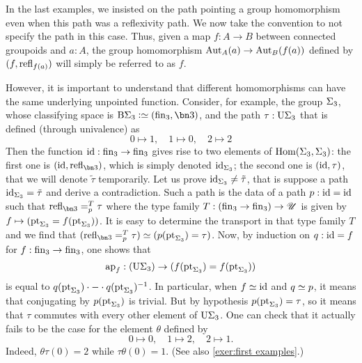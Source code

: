 \begin{remark}
  In the last examples, we insisted on the path pointing a group
  homomorphism even when this path was a reflexivity path. We now take
  the convention to not specify the path in this case. Thus, given a
  map $f:A \to B$ between connected groupoids and $a:A$, the group
  homomorphism $\Aut_A(a) \to \Aut_B(f(a))$ defined by
  $(f,\refl{f(a)})$ will simply be referred to as $f$.

  However, it is important to understand that different homomorphisms
  can have the same underlying unpointed function. Consider, for
  example, the group $\Sigma_{{3}}$, whose classifying space is
  $\clf \permgrp 3\defequi (\fin_3,\bn 3)$, and the path
  $\tau:\mathrm{U}{\Sigma_{{3}}}$ that is defined (through
  univalence) as
  \begin{displaymath}
    0\mapsto 1,\quad 1\mapsto 0,\quad 2 \mapsto 2 
  \end{displaymath}
  Then the function $\id: \fin_3 \to \fin_3$ gives rise to two
  elements of $\Hom(\permgrp 3,\permgrp 3)$: the first one is
  $(\id,\refl{\bn 3})$, which is simply denoted $\mathord{\mathrm{id}}_{\Sigma_{{3}}}$;
  the second one is $(\mathord{\mathrm{id}},\tau)$, that we will denote $\tilde\tau$
  temporarily. Let us prove $\mathord{\mathrm{id}}_{\Sigma_{{3}}} \neq \tilde \tau$, that
  is suppose a path $\mathord{\mathrm{id}}_{\Sigma_{{3}}}= \tilde \tau$ and derive a
  contradiction. Such a path is the data of a path $p:\mathord{\mathrm{id}} = \mathord{\mathrm{id}}$ such
  that $\pathover {\refl{\bn 3}} {T} {p} \tau$ where the type family
  $T:(\fin_3\to\fin_3) \to \UU$ is given by
  $f\mapsto (\mathrm{pt}_{\Sigma_{{3}}} = f(\mathrm{pt}_{\Sigma_{{3}}}))$. It is easy to
  determine the transport in that type family $T$ and we find that
  $(\pathover {\refl{\bn 3}} {T} {p} \tau) \weq (p(\pt_{\permgrp
    3})=\tau)$. Now, by induction on $q:\mathord{\mathrm{id}}=f$ for
  $f:\fin_3 \to \fin_3$, one shows that
  \begin{displaymath}
    \ap f : (\USym{\permgrp 3}) \to
    (f(\pt_{\permgrp 3}) = f(\pt_{\permgrp 3}))
  \end{displaymath}
  is equal to
  $q(\mathrm{pt}_{\Sigma_{{3}}})\cdot {{-}}\cdot q(\mathrm{pt}_{\Sigma_{{3}}})^{-1}$. In particular, when $f\jdeq \id$ and $q\jdeq p$, it means
  that conjugating by $p(\mathrm{pt}_{\Sigma_{{3}}})$ is trivial. But by
  hypothesis $p(\mathrm{pt}_{\Sigma_{{3}}}) = \tau$, so it means that $\tau$
  commutes with every other element of
  $\mathrm{U}{\Sigma_{{3}}}$. One can check that it
  actually fails to be the case for the element $\theta$ defined by
  \begin{displaymath}
    0\mapsto 0,\quad 1\mapsto 2,\quad 2\mapsto 1 .
  \end{displaymath}
  Indeed, $\theta\tau(0) = 2$ while $\tau\theta(0) = 1$. (See also
  \cref{exer:first examples}.)
\end{remark}

